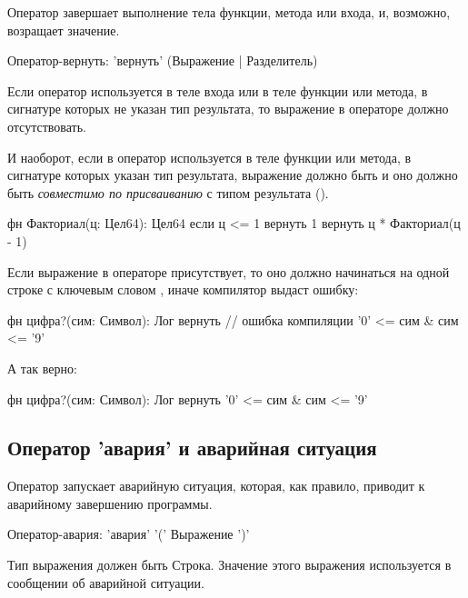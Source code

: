 Оператор  завершает выполнение тела функции, метода или входа, и, возможно, возращает значение.

\begin{Grammar}
Оператор-вернуть: 'вернуть' (Выражение | Разделитель)
\end{Grammar}

Если оператор  используется в теле входа или в теле функции или метода, в сигнатуре которых не указан тип результата, 
то выражение в операторе должно отсутствовать. 

И наоборот, если в оператор используется в теле функции или метода, в сигнатуре которых указан тип результата, выражение должно быть и 
оно должно быть \emph{совместимо по присваиванию} с типом результата ().

\begin{Trivil}
фн Факториал(ц: Цел64): Цел64 {
    если ц <= 1 { вернуть 1 }
    вернуть ц * Факториал(ц - 1)
}
\end{Trivil}

Если выражение в операторе присутствует, то оно должно начинаться на одной строке с ключевым словом ,
иначе компилятор выдаст ошибку:
\begin{SampleErr}[vspace=2pt]
фн цифра?(сим: Символ): Лог {
    вернуть  // ошибка компиляции
        '0' <= сим & сим <= '9'
}
\end{SampleErr}

А так верно:
\begin{Trivil}[vspace=2pt]
фн цифра?(сим: Символ): Лог {
    вернуть '0' <= сим 
      & сим <= '9'
}
\end{Trivil}



\hypertarget{crash-stmt}{%
\subsection{Оператор 'авария' и аварийная ситуация}\label{stmt:crash-stmt}}

Оператор  запускает аварийную ситуация, которая, как правило, приводит к аварийному завершению программы. 

\begin{Grammar}
Оператор-авария: 'авария' '(' Выражение ')'
\end{Grammar}

Тип выражения должен быть Строка. Значение этого выражения используется в сообщении об аварийной ситуации.

